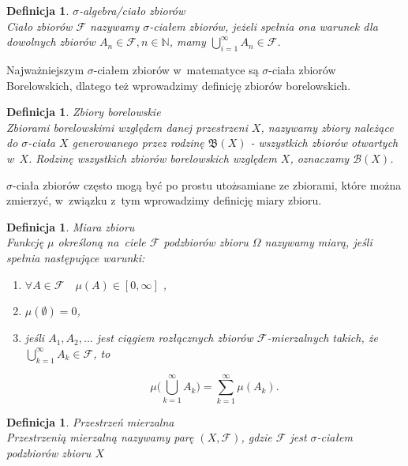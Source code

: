 \documentclass[12pt,a4paper]{report}
\newtheorem{definition}[theorem]{Definicja}
\begin{document}
\begin{definition}{$\sigma$-algebra/ciało zbiorów\cite[Rozdział 8.1]{rudnicki2006}}\\
Ciało zbiorów $\mathcal{F}$ nazywamy $\sigma$-ciałem zbiorów, jeżeli spełnia ona warunek
dla dowolnych zbiorów $A_{n} \in \mathcal{F}, n \in \mathbb{N}$, mamy
$\bigcup\limits_{i=1}^{\infty} A_n \in \mathcal{F}$.
\end{definition}
Najważniejszym $\sigma$-ciałem zbiorów w~matematyce są $\sigma$-ciała zbiorów Borelowskich, dlatego też wprowadzimy definicję zbiorów borelowskich. 



\begin{definition}{Zbiory borelowskie \cite[w opraciu o~rozdział 2]{billingsley1987}}\\
Zbiorami borelowskimi względem danej przestrzeni $X$, nazywamy zbiory należące do $\sigma$-ciała $X$ generowanego przez rodzinę $\mathfrak{B}(X)$ - wszystkich zbiorów otwartych w~$X$. Rodzinę wszystkich zbiorów borelowskich względem $X$, oznaczamy $\mathcal{B}(X)$.
\end{definition}

$\sigma$-ciała zbiorów często mogą być po prostu utożsamiane ze zbiorami, które można zmierzyć, w~związku z~tym wprowadzimy definicję miary zbioru.

\begin{definition}{Miara zbioru \cite[Rozdział 2.10] {billingsley1987}}\\
Funkcję $\mu$ określoną na~ciele $\mathcal{F}$ podzbiorów zbioru $\Omega$ nazywamy miarą, jeśli spełnia następujące warunki: 
\begin{enumerate}
\item $\forall{\textit{A} \in \mathcal{F}} \quad \mu(A) \in [0, \infty]$ ,
\item $\mu(\emptyset)=0$,
\item jeśli $A_1, A_2,...$ jest ciągiem rozłącznych zbiorów $\mathcal{F}$-mierzalnych takich, że $\bigcup\limits_{k=1}^{\infty} A_k \in \mathcal{F}$, to 

$$\mu\big(\bigcup\limits_{k=1}^{\infty} A_k\big)=\sum_{k=1}^{\infty} \mu(A_k).$$

\end{enumerate}
\end{definition}


\begin{definition}{Przestrzeń mierzalna \cite[Rozdział 2.10]{billingsley1987}}\\
Przestrzenią mierzalną nazywamy parę $(X, \mathcal{F})$, gdzie $\mathcal{F}$ jest $\sigma$-ciałem podzbiorów zbioru $X$
\end{definition}
\end{document}
